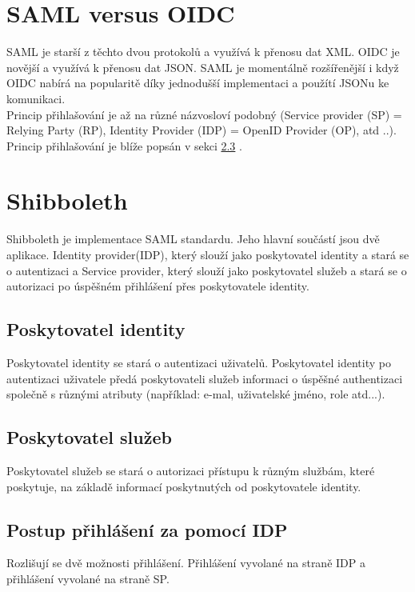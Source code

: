 \section{SAML versus OIDC}

SAML je starší z těchto dvou protokolů a využívá k přenosu dat XML. OIDC je novější a využívá k přenosu dat JSON. 
SAML je momentálně rozšířenější i když OIDC nabírá na popularitě díky jednodušší implementaci a použítí JSONu ke komunikaci.\cite{SAMLxOIDC} \\
Princip přihlašování je až na různé názvosloví podobný (Service provider (SP) = Relying Party (RP),  Identity Provider (IDP) = OpenID Provider (OP), atd ..).
Princip přihlašování je blíže popsán v sekci \ref{IDPlogin} .

\section{Shibboleth}

Shibboleth je implementace SAML standardu. Jeho hlavní součástí jsou dvě aplikace. Identity provider(IDP), který slouží jako poskytovatel identity a stará se o autentizaci a Service provider, který slouží jako poskytovatel služeb a stará se o autorizaci po úspěšném přihlášení přes poskytovatele identity. \cite{shibbolethWiki}

\subsection{Poskytovatel identity}

Poskytovatel identity se stará o autentizaci uživatelů. Poskytovatel identity po autentizaci uživatele předá poskytovateli služeb informaci o úspěšné authentizaci společně s různými atributy (například: e-mal, uživatelské jméno, role atd...).

\subsection{Poskytovatel služeb}

Poskytovatel služeb se stará o autorizaci přístupu k různým službám, které poskytuje, na základě informací poskytnutých od poskytovatele identity.

\subsection{Postup přihlášení za pomocí IDP}\label{IDPlogin}

Rozlišují se dvě možnosti přihlášení. Přihlášení vyvolané na straně IDP a přihlášení vyvolané na straně SP.


